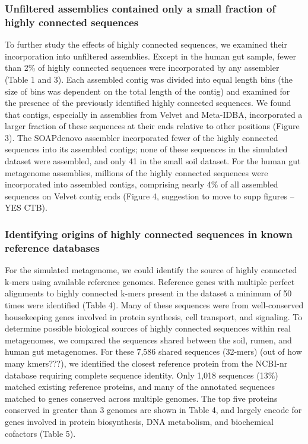 \documentclass[10pt]{article}
\begin{document}
\subsubsection*{Unfiltered assemblies contained only a small fraction of highly connected sequences}
To further study the effects of highly connected sequences, we
examined their incorporation into unfiltered assemblies.  Except in
the human gut sample, fewer than 2\% of highly connected sequences
were incorporated by any assembler (Table 1 and 3).  Each assembled
contig was divided into equal length bins (the size of bins was
dependent on the total length of the contig) and examined for the
presence of the previously identified highly connected sequences.  We
found that contigs, especially in assemblies from Velvet and
Meta-IDBA, incorporated a larger fraction of these sequences at their
ends relative to other positions (Figure 3).  The SOAPdenovo
assembler incorporated fewer of the highly connected sequences into
its assembled contigs; none of these sequences in the simulated
dataset were assembled, and only 41 in the small soil dataset.  For
the human gut metagenome assemblies, millions of the highly connected
sequences were incorporated into assembled contigs, comprising nearly
4\% of all assembled sequences on Velvet contig ends (Figure 4,
suggestion to move to supp figures -- YES CTB).

\subsubsection*{Identifying origins of highly connected sequences in known reference databases}

For the simulated metagenome, we could identify the source of highly
connected k-mers using available reference genomes. Reference genes
with multiple perfect alignments to highly connected k-mers present in
the dataset a minimum of 50 times were identified (Table 4).  Many of
these sequences were from well-conserved housekeeping genes involved
in protein synthesis, cell transport, and signaling.  To determine
possible biological sources of highly connected sequences within real
metagenomes, we compared the sequences shared between the soil, rumen,
and human gut metagenomes.  For these 7,586 shared sequences (32-mers)
(out of how many kmers???), we identified the closest reference
protein from the NCBI-nr database requiring complete sequence
identity.  Only 1,018 sequences (13\%) matched existing reference
proteins, and many of the annotated sequences matched to
genes conserved across multiple genomes.  The top five
proteins conserved in greater than 3 genomes are shown in Table 4, and
largely encode for genes involved in protein biosynthesis, DNA
metabolism, and biochemical cofactors (Table 5).
\end{document}
